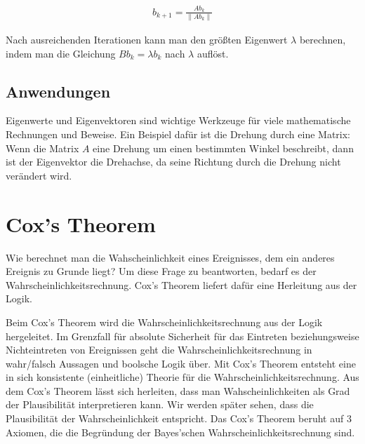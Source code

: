 \documentclass[]{dsadokumentation}
\begin{document}
\begin{equation}
  \begin{aligned}
    b_{k+1} = \frac{Ab_k}{\left\lVert Ab_k \right\rVert }
  \end{aligned}
\end{equation}

Nach ausreichenden Iterationen kann man den größten Eigenwert $\lambda$ berechnen, indem man die Gleichung $B b_{k} = \lambda b_{k}$ nach $\lambda$ auflöst.


\subsection{Anwendungen}

Eigenwerte und Eigenvektoren sind wichtige Werkzeuge für viele mathematische Rechnungen und Beweise. Ein Beispiel dafür ist die Drehung durch eine Matrix: Wenn die Matrix $A$ eine Drehung um einen bestimmten Winkel beschreibt, dann ist der Eigenvektor die Drehachse, da seine Richtung durch die Drehung nicht verändert wird.

\section{Cox's Theorem}
Wie berechnet man die Wahscheinlichkeit eines Ereignisses, dem ein anderes Ereignis zu Grunde liegt? Um diese Frage zu beantworten, bedarf es der Wahrscheinlichkeitsrechnung. Cox's Theorem liefert dafür eine Herleitung aus der Logik.


Beim Cox's Theorem wird die Wahrscheinlichkeitsrechnung aus  der Logik hergeleitet. Im Grenzfall für absolute Sicherheit für das Eintreten beziehungsweise Nichteintreten von Ereignissen geht die Wahrscheinlichkeitsrechnung in wahr/falsch Aussagen und boolsche Logik über. Mit Cox's Theorem entsteht eine in sich konsistente (einheitliche) Theorie für die Wahrscheinlichkeitsrechnung.
Aus dem Cox's Theorem lässt sich herleiten, dass man Wahscheinlichkeiten als Grad der Plausibilität interpretieren kann. Wir werden später sehen, dass die Plausibilität der Wahrscheinlichkeit entspricht.
Das Cox's Theorem beruht auf 3 Axiomen, die die Begründung der Bayes'schen Wahrscheinlichkeitsrechnung sind.
\end{document}
